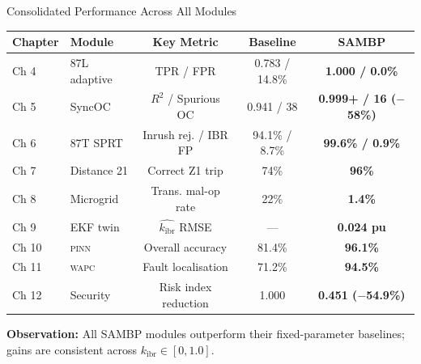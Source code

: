 \documentclass[10pt,aspectratio=169]{beamer}
\newcommand{\obs}[1]{%
  {\color{iitmred}\textbf{Observation:} #1}%
}
\newcommand{\kibr}{k_{\mathrm{ibr}}}
\newcommand{\PINN}{\textsc{pinn}}
\newcommand{\WAPC}{\textsc{wapc}}
\begin{document}
\begin{frame}{Consolidated Performance Across All Modules}
  \begin{center}
  \small
  \begin{tabular}{llccc}
    \toprule
    \textbf{Chapter} & \textbf{Module} & \textbf{Key Metric}
      & \textbf{Baseline} & \textbf{SAMBP}\\
    \midrule
    Ch 4 & 87L adaptive & TPR / FPR
      & 0.783 / 14.8\% & \textbf{1.000 / 0.0\%}\\
    Ch 5 & SyncOC & $R^2$ / Spurious OC
      & 0.941 / 38 & \textbf{0.999+ / 16 ($-$58\%)}\\
    Ch 6 & 87T SPRT & Inrush rej. / IBR FP
      & 94.1\% / 8.7\% & \textbf{99.6\% / 0.9\%}\\
    Ch 7 & Distance 21 & Correct Z1 trip
      & 74\% & \textbf{96\%}\\
    Ch 8 & Microgrid & Trans. mal-op rate
      & 22\% & \textbf{1.4\%}\\
    Ch 9 & EKF twin & $\hat{\kibr}$ RMSE
      & — & \textbf{0.024 pu}\\
    Ch 10 & \PINN & Overall accuracy
      & 81.4\% & \textbf{96.1\%}\\
    Ch 11 & \WAPC & Fault localisation
      & 71.2\% & \textbf{94.5\%}\\
    Ch 12 & Security & Risk index reduction
      & 1.000 & \textbf{0.451 ($-$54.9\%)}\\
    \bottomrule
  \end{tabular}
  \end{center}
  \vspace{0.1cm}
  \obs{All SAMBP modules outperform their fixed-parameter baselines;
    gains are consistent across $\kibr \in [0, 1.0]$.}
\end{frame}
\end{document}

